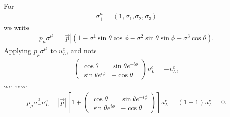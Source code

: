 \documentclass[11pt]{article}
\begin{document}
For
\begin{eqnarray}
   \sigma_+^\mu = (1, \sigma_1, \sigma_2, \sigma_3)
\end{eqnarray}
we write
\begin{eqnarray}
    p_\mu\sigma_+^\mu = |{\vec p}| (1- \sigma^1 \sin\theta\cos\phi -\sigma^2\sin\theta\sin\phi - \sigma^3 \cos\theta).
\end{eqnarray}
Applying $p_\mu\sigma_+^\mu$ to $u_L^c$, and note
\begin{eqnarray}
    \begin{pmatrix}
        \cos\theta & \sin\theta e^{-i\phi} \\ 
        \sin\theta e^{i\phi} & -\cos\theta
    \end{pmatrix}
    u_L^c=-u_L^c,
\end{eqnarray}
we have
\begin{eqnarray}
    p_\mu\sigma_+^\mu u_L^c = |{\vec p}| \left[ 1+
    \begin{pmatrix}
        \cos\theta & \sin\theta e^{-i\phi} \\ 
        \sin\theta e^{i\phi} & -\cos\theta
    \end{pmatrix}
        \right] u_L^c =(1-1)u_L^c=0.
\end{eqnarray}
\end{document}
